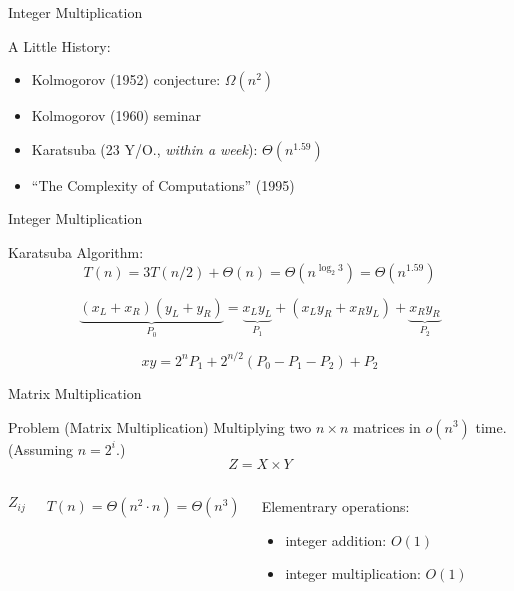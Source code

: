 \documentclass{beamer}
\begin{document}
\begin{frame}{Integer Multiplication}
  \begin{block}{A Little History:}
  \begin{itemize}
    \item Kolmogorov (1952) conjecture: $\Omega(n^2)$
    \item Kolmogorov (1960) seminar
    \item Karatsuba (23 Y/O., \emph{within a week}): $\Theta(n^{1.59})$
    \item ``The Complexity of Computations'' (1995)
  \end{itemize}
  \end{block}
\end{frame}
\begin{frame}{Integer Multiplication}
  \begin{block}{Karatsuba Algorithm:}
    \[
      T(n) = 3T(n/2) + \Theta(n) = \Theta(n^{\log_{2}{3}}) = \Theta(n^{1.59})
    \]

    \[
      \underbrace{(x_L + x_R) (y_L + y_R)}_{P_0} = \underbrace{x_L y_L}_{P_1} +
      (x_L y_R + x_R y_L) + \underbrace{x_R y_R}_{P_2}
    \]

    \[
      xy = 2^{n} P_1 + 2^{n/2} (P_0 - P_1 - P_2) + P_2
    \]
  \end{block}
\end{frame}
\begin{frame}{Matrix Multiplication}
  \begin{exampleblock}{Problem (Matrix Multiplication)}
    Multiplying two $n \times n$ matrices in $o(n^3)$ time. {\small (Assuming $n
    = 2^i$.)}
    \[ Z = X \times Y \]
  \end{exampleblock}

  \vspace{0.50cm}
  \begin{columns}
	  \[ Z_{ij} \]

	  \[ T(n) = \Theta(n^2 \cdot n) = \Theta(n^3) \]
	  \begin{block}{Elementrary operations:}
	    \begin{itemize}
	      \item integer addition: $O(1)$
	      \item integer multiplication: $O(1)$
	    \end{itemize}
	  \end{block}
  \end{columns}
\end{frame}
\end{document}
